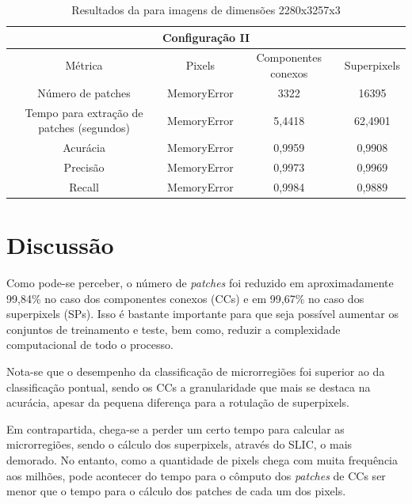 \documentclass{article}
\begin{document}
	\begin{longtable}[c]{@{}cccc@{}}		
		\caption[Resultados da configuração II]{Resultados da para imagens de dimensões 2280x3257x3} \\
		\toprule
		\multicolumn{4}{c}{Configuração II}                                                        \\* \midrule
		\endfirsthead
		\endhead
		Métrica                                   & Pixels      & Componentes conexos & Superpixels \\* \midrule
		Número de patches                         & MemoryError & 3322                & 16395       \\* 
		Tempo para extração de patches (segundos) & MemoryError & 5,4418              & 62,4901     \\* 
		Acurácia                                  & MemoryError & 0,9959              & 0,9908      \\* 
		Precisão                                  & MemoryError & 0,9973              & 0,9969      \\* 
		Recall                                    & MemoryError & 0,9984              & 0,9889      \\* \bottomrule
	\end{longtable}
		
	\section{Discussão}	
	
	Como pode-se perceber, o número de \textit{patches} foi reduzido em aproximadamente 99,84\% no caso dos componentes conexos (CCs) e em 99,67\% no caso dos superpixels (SPs). Isso é bastante importante para que seja possível aumentar os conjuntos de treinamento e teste, bem como, reduzir a complexidade computacional de todo o processo. 
	
	Nota-se que o desempenho da classificação de microrregiões foi superior ao da classificação pontual, sendo os CCs a granularidade que mais se destaca na acurácia, apesar da pequena diferença para a rotulação de superpixels. 
	
	Em contrapartida, chega-se a perder um certo tempo para calcular as microrregiões, sendo o cálculo dos superpixels, através do SLIC, o mais demorado. No entanto, como a quantidade de pixels chega com muita frequência aos milhões, pode acontecer do tempo para o cômputo dos \textit{patches} de CCs ser menor que o tempo para o cálculo dos patches de cada um dos pixels. 
	
\end{document}
